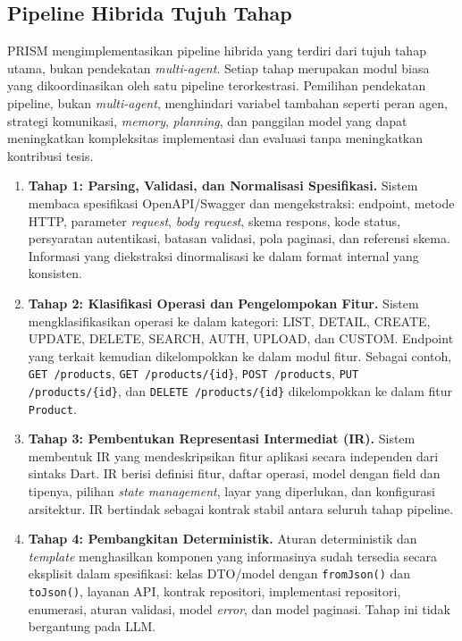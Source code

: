 \subsection{Pipeline Hibrida Tujuh Tahap}

PRISM mengimplementasikan pipeline hibrida yang terdiri dari tujuh tahap utama, bukan pendekatan \textit{multi-agent}. Setiap tahap merupakan modul biasa yang dikoordinasikan oleh satu pipeline terorkestrasi. Pemilihan pendekatan pipeline, bukan \textit{multi-agent}, menghindari variabel tambahan seperti peran agen, strategi komunikasi, \textit{memory}, \textit{planning}, dan panggilan model yang dapat meningkatkan kompleksitas implementasi dan evaluasi tanpa meningkatkan kontribusi tesis.

\begin{enumerate}
    \item \textbf{Tahap 1: Parsing, Validasi, dan Normalisasi Spesifikasi.} Sistem membaca spesifikasi OpenAPI/Swagger dan mengekstraksi: endpoint, metode HTTP, parameter \textit{request}, \textit{body request}, skema respons, kode status, persyaratan autentikasi, batasan validasi, pola paginasi, dan referensi skema. Informasi yang diekstraksi dinormalisasi ke dalam format internal yang konsisten.
    
    \item \textbf{Tahap 2: Klasifikasi Operasi dan Pengelompokan Fitur.} Sistem mengklasifikasikan operasi ke dalam kategori: LIST, DETAIL, CREATE, UPDATE, DELETE, SEARCH, AUTH, UPLOAD, dan CUSTOM. Endpoint yang terkait kemudian dikelompokkan ke dalam modul fitur. Sebagai contoh, \texttt{GET /products}, \texttt{GET /products/\{id\}}, \texttt{POST /products}, \texttt{PUT /products/\{id\}}, dan \texttt{DELETE /products/\{id\}} dikelompokkan ke dalam fitur \texttt{Product}.
    
    \item \textbf{Tahap 3: Pembentukan Representasi Intermediat (IR).} Sistem membentuk IR yang mendeskripsikan fitur aplikasi secara independen dari sintaks Dart. IR berisi definisi fitur, daftar operasi, model dengan field dan tipenya, pilihan \textit{state management}, layar yang diperlukan, dan konfigurasi arsitektur. IR bertindak sebagai kontrak stabil antara seluruh tahap pipeline.
    
    \item \textbf{Tahap 4: Pembangkitan Deterministik.} Aturan deterministik dan \textit{template} menghasilkan komponen yang informasinya sudah tersedia secara eksplisit dalam spesifikasi: kelas DTO/model dengan \texttt{fromJson()} dan \texttt{toJson()}, layanan API, kontrak repositori, implementasi repositori, enumerasi, aturan validasi, model \textit{error}, dan model paginasi. Tahap ini tidak bergantung pada LLM.
    

\end{enumerate}
